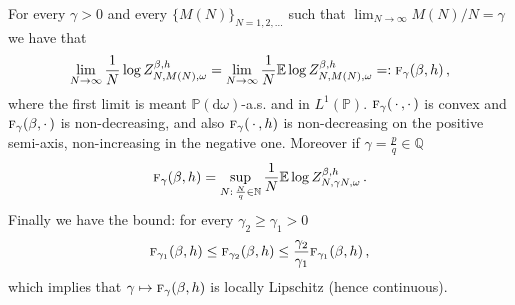 \documentclass[10pt]{amsart}
\theoremstyle{definition}\newtheorem{defi}[theo]{Definition}\newtheorem{rema}[theo]{Remark}\newtheorem{exam}[theo]{Example}\newtheorem{exem}[theo]{Example}\newtheorem{nota}[theo]{Notation}
\newcommand{\gb}{\beta}
\newcommand{\go}{\omega}
\newcommand{\dd}{\mathrm{d}}
\newcommand{\tf}{\textsc{f}} %
\newcommand{\bbE}{\ensuremath{\mathbb{E}}}
\newcommand{\bbN}{\ensuremath{\mathbb{N}}}
\newcommand{\bbP}{\ensuremath{\mathbb{P}}}
\newcommand{\bbQ}{\ensuremath{\mathbb{Q}}}
\begin{document}
\begin{prop}\label{th:existence+}
For every $\gamma>0$ and every $\{M(N)\}_{N=1,2, \ldots}$ such that $\lim_{N \to \infty} M(N)/N=\gamma$ we have that
\begin{equation}\label{eq:existence+.1}
\lim_{N \to \infty} \frac{1}{N} \log Z_{N,M(N), \go}^{\gb,h}= \lim_{N \to \infty}
\frac{1}{N} \bbE \log Z_{N,M(N), \go}^{\gb,h} =: \tf_\gamma(\gb, h)\,,
\end{equation}
where the first limit is meant $\bbP(\dd \go)$-a.s. and in $L^1 (\bbP)$. $\tf_\gamma ({\,\cdot\,,\cdot\,})$ is convex and $\tf_\gamma ({\gb,\cdot\,})$ is non-decreasing, and also $\tf_\gamma ({\,\cdot\,,h})$ is non-decreasing on the positive semi-axis, non-increasing in the negative one. Moreover if $\gamma=\frac{p}{q}\in \bbQ$
\begin{equation}\label{eq:existence+.2}
\tf_\gamma (\gb, h) = \sup_{N:\,\frac{N}{q}\in \bbN} \frac{1}{N} \bbE \log Z_{N, \gamma N, \go}^{\gb,h}\,.
\end{equation}
Finally we have the bound: for every $\gamma_2\ge \gamma_1 >0$
\begin{equation}\label{eq:existence+.3}
\tf_{\gamma_1}(\gb, h) \le \tf_{\gamma_2}(\gb, h)\le \frac{\gamma_2}{\gamma_1} \tf_{\gamma_1}(\gb, h)\,,
\end{equation}
which implies that $\gamma \mapsto \tf_{\gamma}(\gb, h)$ is locally Lipschitz (hence continuous).
\end{prop}
\end{document}
